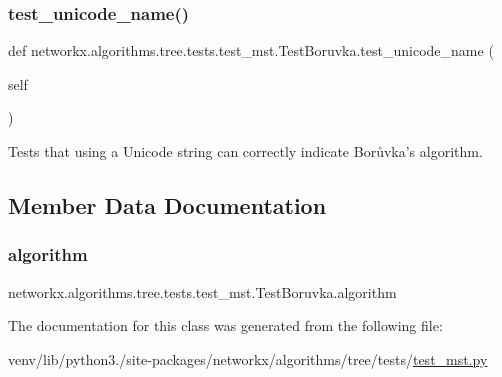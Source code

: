 \subsubsection{\texorpdfstring{test\+\_\+unicode\+\_\+name()}{test\_unicode\_name()}}
{\footnotesize\ttfamily def networkx.\+algorithms.\+tree.\+tests.\+test\+\_\+mst.\+Test\+Boruvka.\+test\+\_\+unicode\+\_\+name (\begin{DoxyParamCaption}\item[{}]{self }\end{DoxyParamCaption})}

\begin{DoxyVerb}Tests that using a Unicode string can correctly indicate
Borůvka's algorithm.\end{DoxyVerb}
 

\subsection{Member Data Documentation}
\mbox{\label{classnetworkx_1_1algorithms_1_1tree_1_1tests_1_1test__mst_1_1TestBoruvka_ab2db7ecf0d2a2c3e496d7b6511c05277}} 
\subsubsection{\texorpdfstring{algorithm}{algorithm}}
{\footnotesize\ttfamily networkx.\+algorithms.\+tree.\+tests.\+test\+\_\+mst.\+Test\+Boruvka.\+algorithm\hspace{0.3cm}{\ttfamily [static]}}



The documentation for this class was generated from the following file\+:\begin{DoxyCompactItemize}
\item 
venv/lib/python3./site-\/packages/networkx/algorithms/tree/tests/\hyperlink{test__mst_8py}{test\+\_\+mst.\+py}\end{DoxyCompactItemize}
